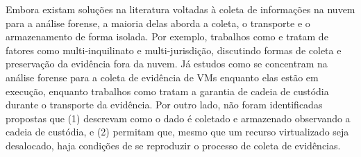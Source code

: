 \documentclass[conference]{IEEEtran}
\newcommand{\marcosT}[1]{{\color{red}{TODO: #1}}}
\begin{document}
%
Embora existam soluções na literatura voltadas à coleta de informações na nuvem para a análise forense, a maioria delas aborda a coleta, o transporte e o armazenamento de forma isolada.
%
Por exemplo, trabalhos como \cite{Dykstra_FROST:2013} e \cite{Reichert_Auto_acquisition:2015} tratam de fatores como multi-inquilinato e multi-jurisdição, discutindo formas de coleta e preservação da evidência fora da nuvem.
%
Já estudos como \cite{George_DF2CE:2012} se concentram na análise forense para a coleta de evidência de VMs enquanto elas estão em execução, enquanto trabalhos como \cite{Sang_Log_approach:2013} tratam a garantia de cadeia de custódia durante o transporte da evidência.
%
%
%
Por outro lado, não foram identificadas propostas que (1) descrevam como o dado é coletado e armazenado observando a cadeia de custódia, e (2) permitam que, mesmo que um recurso virtualizado seja desalocado, haja condições de se reproduzir o processo de coleta de evidências.
\end{document}
